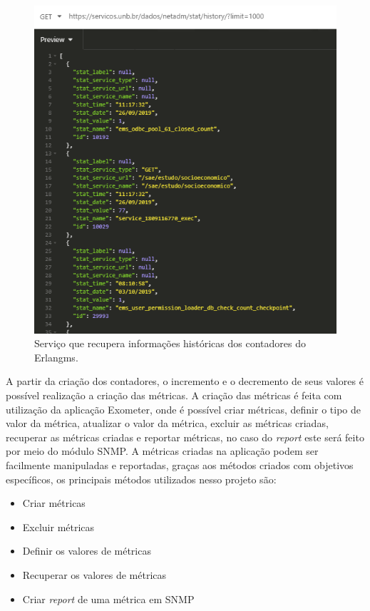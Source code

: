 \begin{figure}[h!]
	\begin{center}
	\includegraphics[scale = 0.70]{img/webserviceStats.png}
	\caption{Serviço que recupera informações históricas dos contadores do Erlangms.}
	\label{fun:fig:webserviceStats}
	\end{center}
\end{figure}

A partir da criação dos contadores, o incremento e o decremento de seus valores é possível realização a criação das métricas. A criação das métricas é feita com utilização da aplicação Exometer, onde é possível criar métricas, definir o tipo de valor da métrica, atualizar o valor da métrica, excluir as métricas criadas, recuperar as métricas criadas e reportar métricas, no caso do \textit{report} este será feito por meio do módulo \acrshort{SNMP}. A métricas criadas na aplicação podem ser facilmente manipuladas e reportadas, graças aos métodos criados com objetivos específicos, os principais métodos utilizados nesso projeto são:
\begin{itemize}
    \item Criar métricas
    \item Excluir métricas
    \item Definir os valores de métricas
    \item Recuperar os valores de métricas
    \item Criar \textit{report} de uma métrica em SNMP
\end{itemize}

